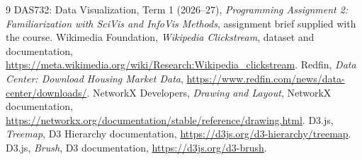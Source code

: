 \documentclass[11pt,letterpaper]{article}
\begin{document}
\begin{thebibliography}{9}
 DAS732: Data Visualization, Term 1 (2026--27), \emph{Programming Assignment 2: Familiarization with SciVis and InfoVis Methods}, assignment brief supplied with the course.
 Wikimedia Foundation, \emph{Wikipedia Clickstream}, dataset and documentation, \url{https://meta.wikimedia.org/wiki/Research:Wikipedia_clickstream}.
 Redfin, \emph{Data Center: Download Housing Market Data}, \url{https://www.redfin.com/news/data-center/downloads/}.
 NetworkX Developers, \emph{Drawing and Layout}, NetworkX documentation, \url{https://networkx.org/documentation/stable/reference/drawing.html}.
 D3.js, \emph{Treemap}, D3 Hierarchy documentation, \url{https://d3js.org/d3-hierarchy/treemap}.
 D3.js, \emph{Brush}, D3 documentation, \url{https://d3js.org/d3-brush}.
\end{thebibliography}
\end{document}
